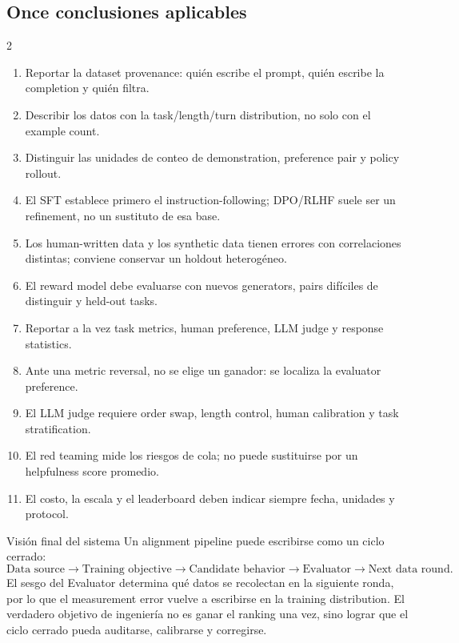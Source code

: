\documentclass[a4paper]{article}
\begin{document}
\subsection{Once conclusiones aplicables}

\begingroup
\footnotesize
\setlength{\columnsep}{1.2em}
\begin{multicols}{2}
\begin{enumerate}[itemsep=0.05em,topsep=0.1em,parsep=0pt,leftmargin=*]
  \item Reportar la dataset provenance: quién escribe el prompt, quién escribe la completion y quién filtra.
  \item Describir los datos con la task/length/turn distribution, no solo con el example count.
  \item Distinguir las unidades de conteo de demonstration, preference pair y policy rollout.
  \item El SFT establece primero el instruction-following; DPO/RLHF suele ser un refinement, no un sustituto de esa base.
  \item Los human-written data y los synthetic data tienen errores con correlaciones distintas; conviene conservar un holdout heterogéneo.
  \item El reward model debe evaluarse con nuevos generators, pairs difíciles de distinguir y held-out tasks.
  \item Reportar a la vez task metrics, human preference, LLM judge y response statistics.
  \item Ante una metric reversal, no se elige un ganador: se localiza la evaluator preference.
  \item El LLM judge requiere order swap, length control, human calibration y task stratification.
  \item El red teaming mide los riesgos de cola; no puede sustituirse por un helpfulness score promedio.
  \item El costo, la escala y el leaderboard deben indicar siempre fecha, unidades y protocol.
\end{enumerate}
\end{multicols}
\endgroup

\begin{importantbox}{Visión final del sistema}
Un alignment pipeline puede escribirse como un ciclo cerrado:
\[
\text{Data source}\rightarrow\text{Training objective}\rightarrow\text{Candidate behavior}
\rightarrow\text{Evaluator}\rightarrow\text{Next data round}.
\]
El sesgo del Evaluator determina qué datos se recolectan en la siguiente ronda, por lo que el measurement error vuelve a escribirse en la training distribution. El verdadero objetivo de ingeniería no es ganar el ranking una vez, sino lograr que el ciclo cerrado pueda auditarse, calibrarse y corregirse.
\end{importantbox}
\end{document}
